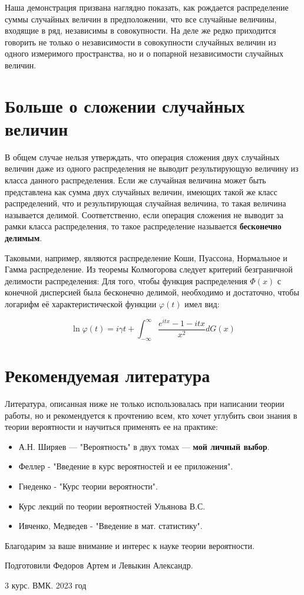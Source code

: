 \documentclass{article}
\begin{document}
    Наша демонстрация призвана наглядно показать, как рождается распределение суммы случайных величин в предположении, что все случайные величины, входящие в ряд, независимы в совокупности. На деле же редко приходится говорить не только о независимости в совокупности случайных величин из одного измеримого пространства, но и о попарной независимости случайных величин. 

\section{Больше о сложении случайных величин}
    В общем случае нельзя утверждать, что операция сложения двух случайных величин даже из одного распределения не выводит результирующую величину из класса данного распределения. Если же случайная величина может быть представлена как сумма двух случайных величин, имеющих такой же класс распределений, что и результирующая случайная величина, то такая величина называется делимой. Соответственно, если операция сложения не выводит за рамки класса распределения, то такое распределение называется \textbf{бесконечно делимым}.

    Таковыми, например, являются распределение Коши, Пуассона, Нормальное и Гамма распределение. Из теоремы Колмогорова следует критерий безграничной делимости распределения: Для того, чтобы функция распределения $\Phi(x)$ с конечной дисперсией была бесконечно делимой, необходимо и достаточно, чтобы логарифм её характеристической функции $\varphi(t)$ имел вид: 

    $$\ln \varphi(t)=i \gamma t+\int_{-\infty}^{\infty} \frac{e^{i t x}-1-i t x}{x^2} d G(x)$$

\section{Рекомендуемая литература}
    Литература, описанная ниже не только использовалась при написании теории работы, но и рекомендуется к прочтению всем, кто хочет углубить свои знания в теории вероятности и научиться применять ее на практике:

    \begin{itemize}
        \item А.Н. Ширяев — "Вероятность" в двух томах — \textbf{мой личный выбор}.
        \item Феллер - "Введение в курс вероятностей и ее приложения".
        \item Гнеденко - "Курс теории вероятности".
        \item Курс лекций по теории вероятностей Ульянова В.С. 
        \item Ивченко, Медведев - "Введение в мат. статистику".
    \end{itemize}


\begin{center}
    Благодарим за ваше внимание и интерес к науке теории вероятности.
    
    Подготовили Федоров Артем и Левыкин Александр.
    
    3 курс. ВМК. 2023 год
\end{center}
\end{document}
